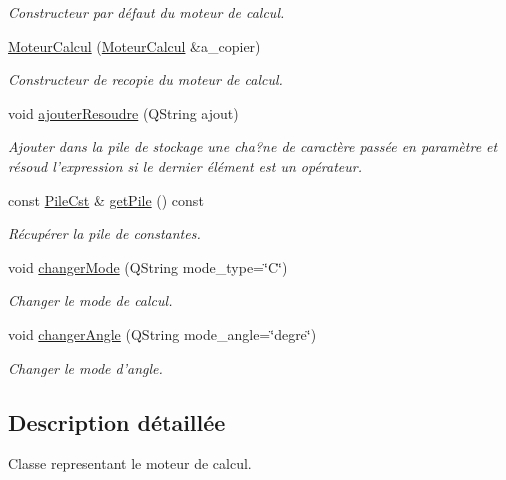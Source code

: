 \begin{DoxyCompactItemize}
\begin{DoxyCompactList}\small\item\em Constructeur par défaut du moteur de calcul. \end{DoxyCompactList}\item 
\hyperlink{classcalcul_1_1_moteur_calcul_a08099d4c72376d5bef0aa14c43f08733}{Moteur\-Calcul} (\hyperlink{classcalcul_1_1_moteur_calcul}{Moteur\-Calcul} \&a\-\_\-copier)
\begin{DoxyCompactList}\small\item\em Constructeur de recopie du moteur de calcul. \end{DoxyCompactList}\item 
void \hyperlink{classcalcul_1_1_moteur_calcul_af0433c3b84f5aae984fc94feef12ce4e}{ajouter\-Resoudre} (Q\-String ajout)
\begin{DoxyCompactList}\small\item\em Ajouter dans la pile de stockage une cha?ne de caractère passée en paramètre et résoud l'expression si le dernier élément est un opérateur. \end{DoxyCompactList}\item 
const \hyperlink{classcalcul_1_1_pile_cst}{Pile\-Cst} \& \hyperlink{classcalcul_1_1_moteur_calcul_a7283f0b19699bccf7062d3c791832ffa}{get\-Pile} () const 
\begin{DoxyCompactList}\small\item\em Récupérer la pile de constantes. \end{DoxyCompactList}\item 
void \hyperlink{classcalcul_1_1_moteur_calcul_a8e4aae58c5cb9102cb724a90c52563d9}{changer\-Mode} (Q\-String mode\-\_\-type=\char`\"{}C\char`\"{})
\begin{DoxyCompactList}\small\item\em Changer le mode de calcul. \end{DoxyCompactList}\item 
void \hyperlink{classcalcul_1_1_moteur_calcul_acbd9ee3b5e3b7b3004131bd4a2e4576e}{changer\-Angle} (Q\-String mode\-\_\-angle=\char`\"{}degre\char`\"{})
\begin{DoxyCompactList}\small\item\em Changer le mode d'angle. \end{DoxyCompactList}\end{DoxyCompactItemize}


\subsection{Description détaillée}
Classe representant le moteur de calcul. 

